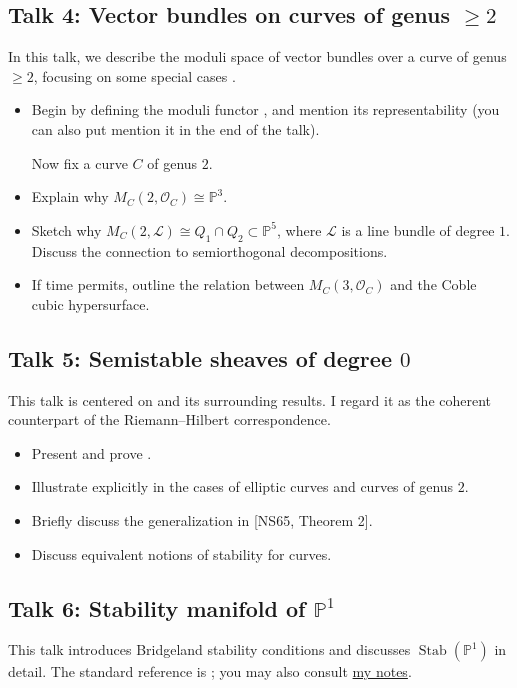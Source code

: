 \documentclass[UTF8]{amsart}
\numberwithin{equation}{section}
\theoremstyle{plain}
\numberwithin{equation}{section}
\theoremstyle{remark}
\DeclareMathOperator{\Stab}{\operatorname{Stab}}
\begin{document}
\subsection*{Talk 4: Vector bundles on curves of genus $\geqslant 2$}\cite[2.3 \& 2.5]{MS19}
In this talk, we describe the moduli space of vector bundles over a curve of genus $\geqslant 2$, focusing on some special cases \cite[Examples 2.18–2.20]{MS19}.

\begin{itemize}
\item Begin by defining the moduli functor \cite[Definition 2.9]{MS19}, and mention its representability \cite[Theorem 2.10]{MS19} (you can also put mention it in the end of the talk).

\noindent \hspace{-8mm} Now fix a curve $C$ of genus $2$.
\item Explain why $M_C(2, \mathcal{O}_C) \cong \mathbb{P}^3$.
\item Sketch why $M_C(2, \mathcal{L}) \cong Q_1 \cap Q_2 \subset \mathbb{P}^5$, where $\mathcal{L}$ is a line bundle of degree $1$. Discuss the connection to semiorthogonal decompositions.
\item If time permits, outline the relation between $M_C(3, \mathcal{O}_C)$ and the Coble cubic hypersurface.
\end{itemize}

\subsection*{Talk 5: Semistable sheaves of degree $0$}\cite[2.4]{MS19}
This talk is centered on \cite[Theorem 2.14]{MS19} and its surrounding results. I regard it as the coherent counterpart of the Riemann--Hilbert correspondence.

\begin{itemize}
\item Present and prove \cite[Theorem 2.14]{MS19}.
\item Illustrate \cite[Theorem 2.14]{MS19} explicitly in the cases of elliptic curves and curves of genus $2$.
\item Briefly discuss the generalization in [NS65, Theorem 2].
\item  Discuss equivalent notions of stability for curves.
\end{itemize}

\subsection*{Talk 6: Stability manifold of $\mathbb{P}^1$}
This talk introduces Bridgeland stability conditions and discusses $\Stab(\mathbb{P}^1)$ in detail. The standard reference is \cite{Okada05,GKR03}; you may also consult \href{https://github.com/ramified/personal_handwritten_collection/raw/main/weeklyupdate/2025/2025.07.13_stability_manifold_of_P\%5E1.pdf}{my notes}.
\end{document}
